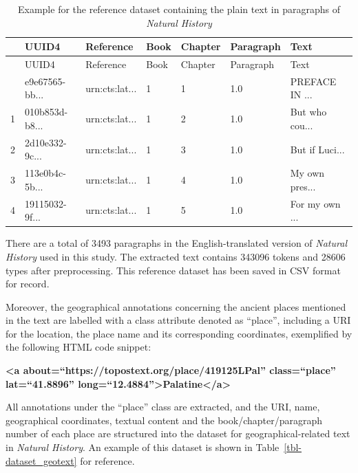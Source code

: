 \documentclass[
  12pt,
]{article}
\begin{document}
\hypertarget{tbl-dataset_plaintext}{}
\begin{longtable}[]{@{}lllllll@{}}
\caption{\label{tbl-dataset_plaintext}Example for the reference dataset
containing the plain text in paragraphs of \emph{Natural
History}}\tabularnewline
\toprule\noalign{}
& UUID4 & Reference & Book & Chapter & Paragraph & Text \\
\midrule\noalign{}
\endfirsthead
\toprule\noalign{}
& UUID4 & Reference & Book & Chapter & Paragraph & Text \\
\midrule\noalign{}
\endhead
\bottomrule\noalign{}
\endlastfoot
0 & e9e67565-bb... & urn:cts:lat... & 1 & 1 & 1.0 & PREFACE IN ... \\
1 & 010b853d-b8... & urn:cts:lat... & 1 & 2 & 1.0 & But who cou... \\
2 & 2d10e332-9c... & urn:cts:lat... & 1 & 3 & 1.0 & But if Luci... \\
3 & 113e0b4c-5b... & urn:cts:lat... & 1 & 4 & 1.0 & My own pres... \\
4 & 19115032-9f... & urn:cts:lat... & 1 & 5 & 1.0 & For my own ... \\
\end{longtable}

There are a total of 3493 paragraphs in the English-translated version
of \emph{Natural History} used in this study. The extracted text
contains 343096 tokens and 28606 types after preprocessing. This
reference dataset has been saved in CSV format for record.

Moreover, the geographical annotations concerning the ancient places
mentioned in the text are labelled with a class attribute denoted as
``place'', including a URI for the location, the place name and its
corresponding coordinates, exemplified by the following HTML code
snippet:

\textbf{\textless a about=``https://topostext.org/place/419125LPal''
class=``place'' lat=``41.8896''
long=``12.4884''\textgreater Palatine\textless/a\textgreater{}}

All annotations under the ``place'' class are extracted, and the URI,
name, geographical coordinates, textual content and the
book/chapter/paragraph number of each place are structured into the
dataset for geographical-related text in \emph{Natural History}. An
example of this dataset is shown in Table~\ref{tbl-dataset_geotext} for
reference.
\end{document}

